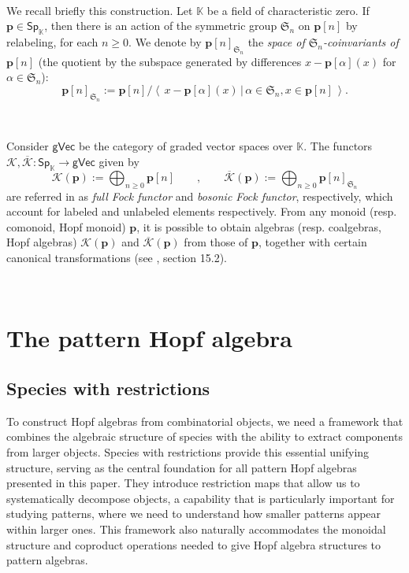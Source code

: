 \documentclass[12pt, reqno]{amsart}
\theoremstyle{definition}
\newcommand{\gVec}{\mathsf{gVec}}
\newcommand{\Ssk}{\mathsf{Sp}_\Kb} %
\newcommand{\Kb}{\mathbb{K}}
\newcommand{\tp}{\mathbf{p}}
\newcommand{\Kc}{\mathcal{K}}
\newcommand{\Kcb}{\overline{\Kc}}
\begin{document}
\

We recall briefly this construction. Let $\mathbb{K}$ be a field of characteristic zero. If $\tp \in \Ssk$, then there is an action of the symmetric group $\mathfrak{S}_n$ on $\tp[n]$ by relabeling, for each $n \geq 0$. We denote by $\tp[n]_{\mathfrak{S}_n}$ the \emph{space of $\mathfrak{S}_n$-coinvariants of $\tp[n]$} (the quotient by the subspace generated by differences $x - \tp[\alpha](x)$ for $\alpha \in \mathfrak{S}_n$):
\begin{equation}
  \tp[n]_{\mathfrak{S}_n}:=\tp[n]/\left\langle \, x- \tp[\alpha](x) \, | \, \alpha \in \mathfrak{S}_n, x\in \tp[n] \,\right\rangle.
\end{equation}

\


Consider $\gVec$ be the category of graded vector spaces over $\mathbb{K}$. The functors $\Kc, \Kcb: \Ssk \to \gVec$ given by
\begin{equation}
    \Kc(\tp):=\bigoplus_{n \geq 0}\tp[n] \qquad , \qquad \Kcb(\tp):= \bigoplus_{n \geq 0}\tp[n]_{\mathfrak{S}_n}
\end{equation}
are referred in \cite{AM2010} as \emph{full Fock functor} and \emph{bosonic Fock functor}, respectively, which account for labeled and unlabeled elements respectively. From any monoid (resp. comonoid, Hopf monoid) $\tp$, it is possible to obtain algebras (resp. coalgebras, Hopf algebras) $\Kc(\tp)$ and $\Kcb(\tp)$ from those of $\tp$, together with certain canonical transformations (see \cite{AM2010}, section 15.2).

\


\section{The pattern Hopf algebra \label{sec:pattern_algebra_contruction}}

\subsection{Species with restrictions}

To construct Hopf algebras from combinatorial objects, we need a framework that combines the algebraic structure of species with the ability to extract components from larger objects. Species with restrictions provide this essential unifying structure, serving as the central foundation for all pattern Hopf algebras presented in this paper. They introduce restriction maps that allow us to systematically decompose objects, a capability that is particularly important for studying patterns, where we need to understand how smaller patterns appear within larger ones. This framework also naturally accommodates the monoidal structure and coproduct operations needed to give Hopf algebra structures to pattern algebras.
\end{document}
